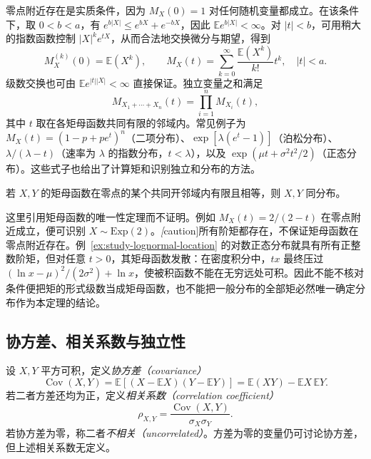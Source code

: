零点附近存在是实质条件，因为 $M_X(0)=1$ 对任何随机变量都成立。在该条件下，取 $0<b<a$，有 $e^{b|X|}\le e^{bX}+e^{-bX}$，因此 $\mathbb E e^{b|X|}<\infty$。对 $|t|<b$，可用稍大的指数函数控制 $|X|^k e^{tX}$，从而合法地交换微分与期望，得到
\begin{equation}
  M_X^{(k)}(0)=\mathbb E(X^k),\qquad
  M_X(t)=\sum_{k=0}^{\infty}\frac{\mathbb E(X^k)}{k!}t^k,
  \quad |t|<a.
  \label{eq:study-mgf-moments}
\end{equation}
级数交换也可由 $\mathbb E e^{|t||X|}<\infty$ 直接保证。独立变量之和满足
\begin{equation}
  M_{X_1+\cdots+X_n}(t)=\prod_{i=1}^nM_{X_i}(t),
  \label{eq:study-mgf-independent-sum}
\end{equation}
其中 $t$ 取在各矩母函数共同有限的邻域内。常见例子为 $M_X(t)=(1-p+pe^t)^n$（二项分布）、$\exp[\lambda(e^t-1)]$（泊松分布）、$\lambda/(\lambda-t)$（速率为 $\lambda$ 的指数分布，$t<\lambda$），以及 $\exp(\mu t+\sigma^2t^2/2)$（正态分布）。这些式子也给出了计算矩和识别独立和分布的方法。

\begin{theorem}
\label{thm:study-mgf-uniqueness}
若 $X,Y$ 的矩母函数在零点的某个共同开邻域内有限且相等，则 $X,Y$ 同分布。
\end{theorem}

这里引用矩母函数的唯一性定理而不证明。例如 $M_X(t)=2/(2-t)$ 在零点附近成立，便可识别 $X\sim\mathrm{Exp}(2)$。\emph[caution]{所有阶矩都存在，不保证矩母函数在零点附近存在。}例~\ref{ex:study-lognormal-location} 的对数正态分布就具有所有正整数阶矩，但对任意 $t>0$，其矩母函数发散：在密度积分中，$tx$ 最终压过 $(\ln x-\mu)^2/(2\sigma^2)+\ln x$，使被积函数不能在无穷远处可积。因此不能不核对条件便把矩的形式级数当成矩母函数，也不能把一般分布的全部矩必然唯一确定分布作为本定理的结论。

\subsection{协方差、相关系数与独立性}
\label{subsec:study-covariance-correlation}

\begin{definition}
\label{def:study-covariance-correlation}
设 $X,Y$ 平方可积，定义\emph{协方差（covariance）}
\begin{equation}
  \operatorname{Cov}(X,Y)
    =\mathbb E[(X-\mathbb E X)(Y-\mathbb E Y)]
    =\mathbb E(XY)-\mathbb E X\,\mathbb E Y.
  \label{eq:study-covariance}
\end{equation}
若二者方差还均为正，定义\emph{相关系数（correlation coefficient）}
\begin{equation}
  \rho_{X,Y}=\frac{\operatorname{Cov}(X,Y)}{\sigma_X\sigma_Y}.
  \label{eq:study-correlation}
\end{equation}
若协方差为零，称二者\emph{不相关（uncorrelated）}。方差为零的变量仍可讨论协方差，但上述相关系数无定义。
\end{definition}

